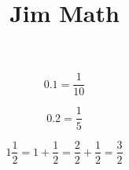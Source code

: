 \documentclass{article}
\title{Jim Math}
\begin{document}
\begin{equation}
0.1 = \frac{1}{10}
\end{equation}

\begin{equation}
0.2 = \frac{1}{5}
\end{equation}

\begin{equation}
1\frac{1}{2} = 1 + \frac{1}{2} = \frac{2}{2} + \frac{1}{2}= \frac{3}{2}
\end{equation}
\end{document}
